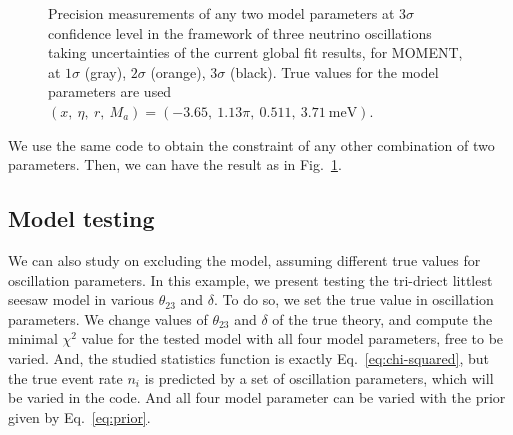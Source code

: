 \documentclass[aps,prd,nofootinbib,preprint]{revtex4}
\begin{document}
\begin{figure}[!h]
 \caption{\label{fig:model_2D}Precision measurements of any two model parameters at 3$\sigma$ confidence level in the framework of three neutrino oscillations taking uncertainties of the current global fit results, for MOMENT, at $1\sigma$ (gray), $2\sigma$ (orange), $3\sigma$ (black). True values for the model parameters are used $(x,~\eta,~r,~M_a)=(-3.65,~1.13\pi,~0.511,~3.71~\text{meV})$.}
\end{figure}


We use the same code to obtain the constraint of any other combination of two parameters. Then, we can have the result as in Fig.~\ref{fig:model_2D}.





\subsection{Model testing}

We can also study on excluding the model, assuming different true values for oscillation parameters. In this example, we present testing the tri-driect littlest seesaw model in various $\theta_{23}$ and $\delta$. To do so, we set the true value in oscillation parameters. We change values of $\theta_{23}$ and $\delta$ of the true theory, and compute the minimal $\chi^2$ value for the tested model with all four model parameters, free to be varied. And, the studied statistics function is exactly Eq.~\ref{eq:chi-squared}, but the true event rate $n_i$ is predicted by a set of oscillation parameters, which will be varied in the code. And all four model parameter can be varied with the prior given by Eq.~\ref{eq:prior}.
\end{document}
